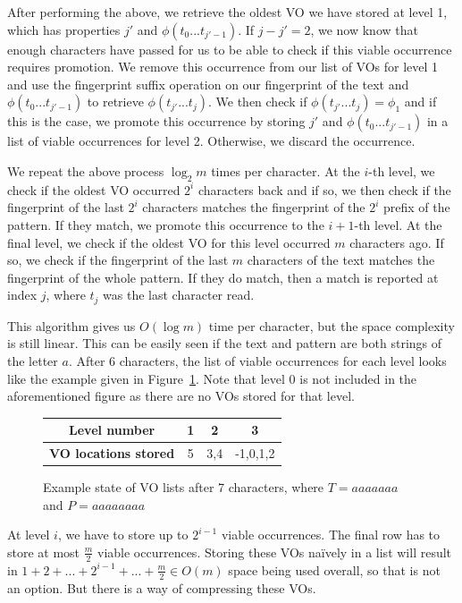 \documentclass[ %
                    author={Dominic Joseph Moylett},
                    degree={MEng},
                     title={Dictionary Matching with Fingerprints},
                  subtitle={An Empirical Analysis},
                      type={research},
                      year={2015} ]{dissertation}
\begin{document}
After performing the above, we retrieve the oldest VO we have stored at level 1, which has properties $j'$ and $\phi(t_0...t_{j'-1})$. If $j - j' = 2$, we now know that enough characters have passed for us to be able to check if this viable occurrence requires promotion. We remove this occurrence from our list of VOs for level 1 and use the fingerprint suffix operation on our fingerprint of the text and $\phi(t_0...t_{j'-1})$ to retrieve $\phi(t_{j'}...t_j)$. We then check if $\phi(t_{j'}...t_j) = \phi_1$ and if this is the case, we promote this occurrence by storing $j'$ and $\phi(t_0...t_{j'-1})$ in a list of viable occurrences for level 2. Otherwise, we discard the occurrence.

We repeat the above process $\log_2m$ times per character. At the $i$-th level, we check if the oldest VO occurred $2^i$ characters back and if so, we then check if the fingerprint of the last $2^i$ characters matches the fingerprint of the $2^i$ prefix of the pattern. If they match, we promote this occurrence to the $i+1$-th level. At the final level, we check if the oldest VO for this level occurred $m$ characters ago. If so, we check if the fingerprint of the last $m$ characters of the text matches the fingerprint of the whole pattern. If they do match, then a match is reported at index $j$, where $t_j$ was the last character read.

This algorithm gives us $O(\log m)$ time per character, but the space complexity is still linear. This can be easily seen if the text and pattern are both strings of the letter $a$. After 6 characters, the list of viable occurrences for each level looks like the example given in Figure~\ref{fig:pp-vos}. Note that level 0 is not included in the aforementioned figure as there are no VOs stored for that level.

\begin{figure}[t]
\centering
\begin{tabular}{|c|c|c|c|}
  \hline
  \textbf{Level number} & 1 & 2 & 3 \\
  \hline
  \textbf{VO locations stored} & 5 & 3,4 & -1,0,1,2 \\
  \hline
\end{tabular}
\caption{Example state of VO lists after 7 characters, where $T = aaaaaaa$ and $P = aaaaaaaa$}
\label{fig:pp-vos}
\end{figure}

At level $i$, we have to store up to $2^{i - 1}$ viable occurrences. The final row has to store at most $\frac{m}{2}$ viable occurrences. Storing these VOs na\"{i}vely in a list will result in $1 + 2 + ... + 2^{i - 1} + ... + \frac{m}{2} \in O(m)$ space being used overall, so that is not an option. But there is a way of compressing these VOs.
\end{document}
